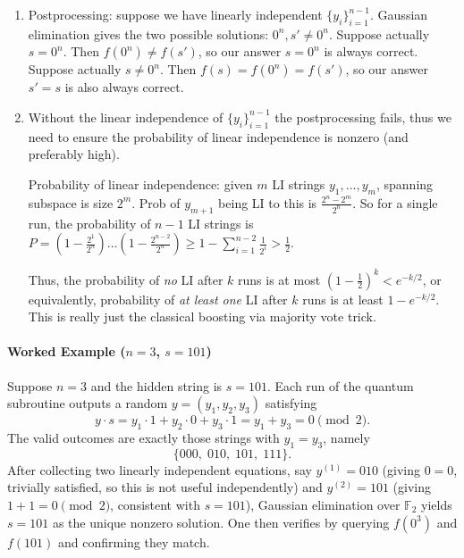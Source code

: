 \begin{enumerate}
    From this viewpoint, the interference argument above has a clean spectral interpretation. Measuring the second register collapses the first register to the \emph{indicator function} of the two-element set $\{x_0, x_0 \oplus s\}$. The WHT of this function is non-zero only on the subspace
    \[
        s^\perp = \{y \in \{0,1\}^n : y \cdot s = 0 \pmod{2}\},
    \]
    which has dimension $n-1$ (i.e.\ $2^{n-1}$ elements). In other words, the WHT concentrates all probability mass on $s^\perp$, and the measurement outcomes are the ``Fourier frequencies'' of the hidden period subgroup $\{0^n, s\}$. Collecting $n-1$ linearly independent elements of $s^\perp$ and solving the resulting linear system over $\mathbb{F}_2$ recovers $s$ — this is the classical Gaussian elimination step.

    \item Postprocessing: suppose we have linearly independent $\{y_i\}_{i=1}^{n-1}$. Gaussian elimination gives the two possible solutions: $0^n,s'\neq 0^n$. Suppose actually $s=0^n$. Then $f(0^n)\neq f(s')$, so our answer $s=0^n$ is always correct. Suppose actually $s \neq 0^n$. Then $f(s)=f(0^n)=f(s')$, so our answer $s'=s$ is also always correct.
    
    \item Without the linear independence of $\{y_i\}_{i=1}^{n-1}$ the postprocessing fails, thus we need to ensure the probability of linear independence is nonzero (and preferably high).
    
    Probability of linear independence: given $m$ LI strings $y_1,\dots,y_m$, spanning subspace is size $2^m$. Prob of $y_{m+1}$ being LI to this is $\frac{2^n-2^m}{2^n}$. So for a single run, the probability of $n-1$ LI strings is $P=(1-\frac{2^1}{2^n})\dots(1-\frac{2^{n-2}}{2^n}) \geq 1-\sum_{i=1}^{n-2} \frac{1}{2^i} > \frac{1}{2}$. 
    
    Thus, the probability of \textit{no} LI after $k$ runs is at most $(1-\frac{1}{2})^k < e^{-k/2}$, or equivalently, probability of \textit{at least one} LI after $k$ runs is at least $1 - e^{-k/2}$. This is really just the classical boosting via majority vote trick.
\end{enumerate}



\paragraph{Worked Example ($n=3$, $s=101$)}

Suppose $n=3$ and the hidden string is $s=101$. Each run of the quantum subroutine outputs a random $y=(y_1,y_2,y_3)$ satisfying
\[
    y \cdot s = y_1 \cdot 1 + y_2 \cdot 0 + y_3 \cdot 1 = y_1 + y_3 = 0 \pmod{2}.
\]
The valid outcomes are exactly those strings with $y_1 = y_3$, namely
\[
    \{000,\; 010,\; 101,\; 111\}.
\]
After collecting two linearly independent equations, say $y^{(1)} = 010$ (giving $0=0$, trivially satisfied, so this is not useful independently) and $y^{(2)} = 101$ (giving $1+1=0 \pmod 2$, consistent with $s=101$), Gaussian elimination over $\mathbb{F}_2$ yields $s=101$ as the unique nonzero solution. One then verifies by querying $f(0^3)$ and $f(101)$ and confirming they match.


